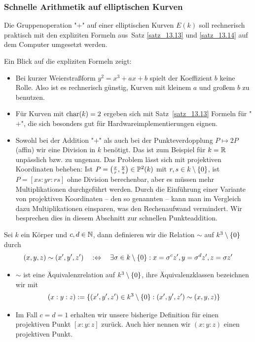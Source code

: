 \nextlecture
\subsubsection{Schnelle Arithmetik auf elliptischen Kurven}
	Die Gruppenoperation "$+$"\marginnote{[15]} auf einer elliptischen Kurven $E(k)$ soll rechnerisch praktisch mit den expliziten Formeln aus~Satz \ref{satz_13.13} und \ref{satz_13.14} auf dem Computer umgesetzt werden. 

\begin{bem}
	Ein Blick auf die expliziten Formeln zeigt:
	\begin{itemize}
		\item Bei kurzer Weierstraßform $y^2 = x^3 + ax + b$ spielt der Koeffizient $b$ keine Rolle.
		Also ist es rechnerisch günstig, Kurven mit kleinem $a$ und großem $b$ zu benutzen.
		\item Für Kurven mit $\Char(k) = 2$ ergeben sich mit Satz~\ref{satz_13.13} Formeln für "$+$", die sich besonders gut für Hardwareimplementierungen eignen.
		\item Sowohl bei der Addition "$+$" als auch bei der Punkteverdopplung $P \mapsto 2P$ (affin) wir eine Division in $k$ benötigt.
		Das ist zum Beispiel für $k = \RR$ unpässlich bzw. zu ungenau.
		Das Problem lässt sich mit projektiven Koordinaten beheben:
		Ist $P = \enbrace*{\frac{x}{r},\frac{y}{s}} \in \PP^2(k)$ mit $r,s \in k \setminus \setnull$, ist $P = [xs:yr:rs]$ ohne Division berechenbar, aber es müssen mehr Multiplikationen durchgeführt werden.
		Durch die Einführung einer Variante von projektiven Koordinaten -- den so genannten  --  kann man im Vergleich dazu Multiplikationen einsparen, was den Rechenaufwand vermindert.
		Wir besprechen dies in diesem Abschnitt zur schnellen Punkteaddition.
	\end{itemize}
\end{bem}

\begin{defn}
	Sei $k$ ein Körper und $c,d \in \NN$, dann definieren wir die Relation $\sim$ auf $k^3\setminus \setnull$ durch
	\[
		(x,y,z) \sim (x',y',z')	\quad :\Leftrightarrow \quad \exists \sigma \in k \setminus \setnull : x = \sigma^c z', y = \sigma^d z', z=\sigma z'
	\]
\end{defn}

\begin{bem}
	\begin{itemize}
		\item $\sim$ ist eine Äquivalenzrelation auf $k^3 \setminus \setnull$, ihre Äquivalenzklassen bezeichnen wir mit
		\[
			(x:y:z) := \{ (x',y',z') \in k^3 \setminus \setnull : (x',y',z') \sim (x,y,z) \}
		\]
		\item Im Fall $c=d=1$ erhalten wir unsere bisherige Definition für einen projektiven Punkt $[x:y:z]$ zurück.
		Auch hier nennen wir $(x:y:z)$ einen projektiven Punkt.
	\end{itemize}
\end{bem}

